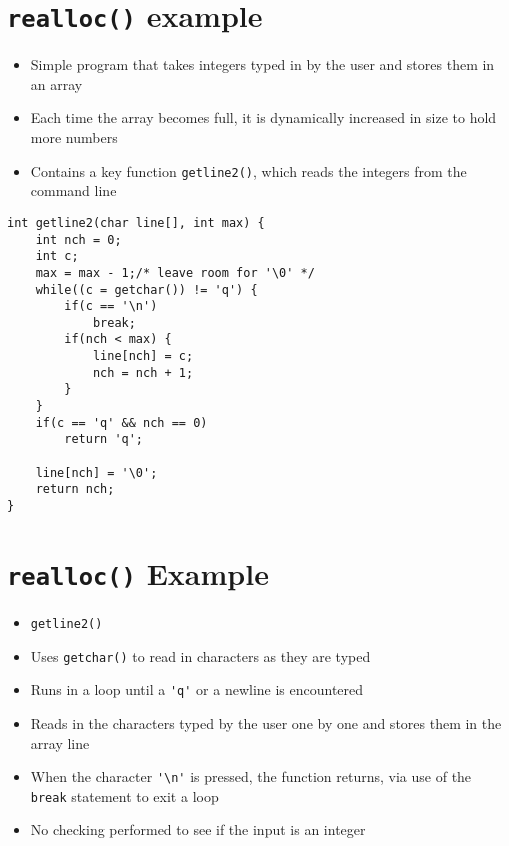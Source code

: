 \documentclass{article}
\begin{document}
\section{\texttt{realloc()} example}
\begin{itemize}
\item Simple program that takes integers typed in by the user and stores them in an array

\item Each time the array becomes full, it is dynamically increased in size to hold more numbers

\item Contains a key function \verb!getline2()!, which reads the integers from the command line
\end{itemize}



\begin{verbatim}
int getline2(char line[], int max) {
    int nch = 0;
    int c;
    max = max - 1;/* leave room for '\0' */
    while((c = getchar()) != 'q') {
        if(c == '\n')
            break;
        if(nch < max) {
            line[nch] = c;
            nch = nch + 1;
        }
    }
    if(c == 'q' && nch == 0)
        return 'q';
    
    line[nch] = '\0';
    return nch;
}
\end{verbatim}



\section{\texttt{realloc()} Example}
\begin{itemize}
\item \verb!getline2()!

\item Uses \verb!getchar()! to read in characters as they are typed

\item Runs in a loop until a \verb!'q'! or a newline is encountered

\item Reads in the characters typed by the user one by one and stores them in the array line

\item When the character \verb!'\n'! is pressed, the function returns, via use of the \verb!break! statement to exit a loop

\item No checking performed to see if the input is an integer
\end{itemize}
\end{document}
